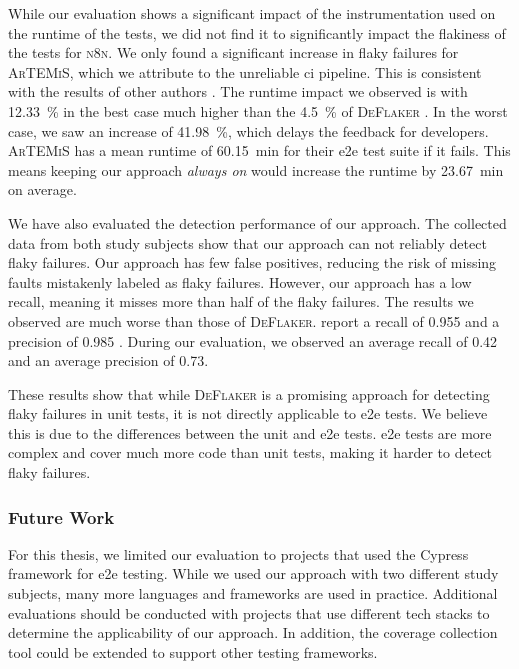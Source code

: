 While our evaluation shows a significant impact of the instrumentation used on the runtime of the tests, we did not find it to significantly impact the flakiness of the tests for \textsc{n8n}.
We only found a significant increase in flaky failures for \textsc{ArTEMiS}, which we attribute to the unreliable \ac{ci} pipeline.
This is consistent with the results of other authors \autocite{rasheed_effect_2023}.
The runtime impact we observed is with \SI{12.33}{\percent} in the best case much higher than the \SI{4.5}{\percent} of \textsc{DeFlaker} \autocite{bell_deflaker_2018}.
In the worst case, we saw an increase of \SI{41.98}{\percent}, which delays the feedback for developers.
\textsc{ArTEMiS} has a mean runtime of \SI{60.15}{\minute} for their \ac{e2e} test suite if it fails.
This means keeping our approach \textit{always on} would increase the runtime by \SI{23.67}{\minute} on average.

We have also evaluated the detection performance of our approach.
The collected data from both study subjects show that our approach can not reliably detect flaky failures.
Our approach has few false positives, reducing the risk of missing faults mistakenly labeled as flaky failures.
However, our approach has a low recall, meaning it misses more than half of the flaky failures.
The results we observed are much worse than those of \textsc{DeFlaker}.
 report a recall of \num{0.955} and a precision of \num{0.985} \autocite{bell_deflaker_2018}.
During our evaluation, we observed an average recall of \num{0.42} and an average precision of \num{0.73}.

These results show that while \textsc{DeFlaker} is a promising approach for detecting flaky failures in unit tests, it is not directly applicable to \ac{e2e} tests.
We believe this is due to the differences between the unit and \ac{e2e} tests.
\Ac{e2e} tests are more complex and cover much more code than unit tests, making it harder to detect flaky failures.

\subsubsection{Future Work}
For this thesis, we limited our evaluation to projects that used the Cypress framework for \ac{e2e} testing.
While we used our approach with two different study subjects, many more languages and frameworks are used in practice.
Additional evaluations should be conducted with projects that use different tech stacks to determine the applicability of our approach.
In addition, the coverage collection tool could be extended to support other testing frameworks.

